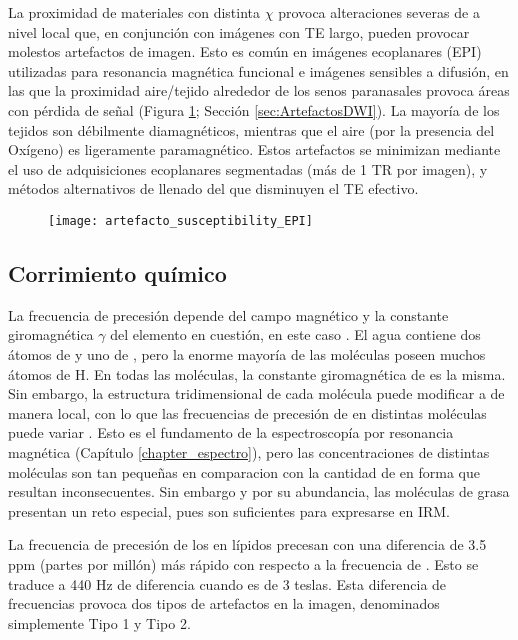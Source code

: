 La proximidad de materiales con distinta $\chi$ provoca alteraciones severas de \Bzero a nivel local que, en conjunción con imágenes con TE largo, pueden provocar molestos artefactos de imagen. Esto es común en imágenes ecoplanares (EPI) utilizadas para resonancia magnética funcional e imágenes sensibles a difusión, en las que la proximidad aire/tejido alrededor de los senos paranasales provoca áreas con pérdida de señal (Figura \ref{fig:artefacto_susceptibility_EPI}; Sección \ref{sec:ArtefactosDWI}). La mayoría de los tejidos son débilmente diamagnéticos, mientras que el aire (por la presencia del Oxígeno) es ligeramente paramagnético. Estos artefactos se minimizan mediante el uso de adquisiciones ecoplanares segmentadas (más de 1 TR por imagen), y métodos alternativos de llenado del \espaciok que disminuyen el TE efectivo. 


\begin{figure}[htb]
 \begin{figg}
   \texttt{[image: artefacto\_susceptibility\_EPI]}
   \caption{\figurapendiente}
 \label{fig:artefacto_susceptibility_EPI}
 \end{figg}
\end{figure}



\subsection{Corrimiento químico}
La frecuencia de precesión depende del campo magnético \Bzero y la constante giromagnética $\gamma$ del elemento en cuestión, en este caso . El agua contiene dos átomos de  y uno de , pero la enorme mayoría de las moléculas poseen muchos átomos de H. En todas las moléculas, la constante giromagnética de  es la misma. Sin embargo, la estructura tridimensional de cada molécula puede modificar a \Bzero de manera local, con lo que las frecuencias de precesión de  en distintas moléculas puede variar \cite{hood1999chemical}. Esto es el fundamento de la espectroscopía por resonancia magnética (Capítulo \ref{chapter_espectro}), pero las concentraciones de distintas moléculas son tan pequeñas en comparacion con la cantidad de  en forma  que resultan inconsecuentes. Sin embargo y por su abundancia, las moléculas de grasa presentan un reto especial, pues son suficientes para expresarse en IRM. 

La frecuencia de precesión de los  en lípidos precesan con una diferencia de 3.5 ppm (partes por millón) más rápido con respecto a la frecuencia de . Esto se traduce a 440 Hz de diferencia cuando \Bzero es de 3 teslas. Esta diferencia de frecuencias provoca dos tipos de artefactos en la imagen, denominados simplemente Tipo 1 y Tipo 2.

